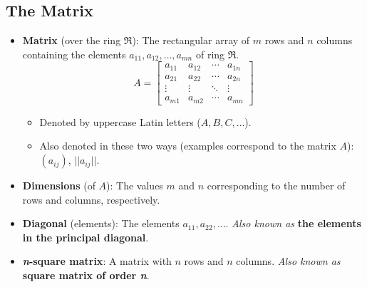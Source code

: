 \documentclass[titlepage]{article}
\numberwithin{figure}{section}
\numberwithin{equation}{section}
\begin{document}
\subsection{The Matrix}
\begin{itemize}
    \item \textbf{Matrix} (over the ring $\mathfrak{R}$): The rectangular array of $m$ rows and $n$ columns containing the elements $a_{11},a_{12},\dots,a_{mn}$ of ring $\mathfrak{R}$.
    \begin{equation*}
        A=
        \begin{bmatrix}
            a_{11} & a_{12} & \cdots & a_{1n}\\
            a_{21} & a_{22} & \cdots & a_{2n}\\
            \vdots & \vdots & \ddots & \vdots\\
            a_{m1} & a_{m2} & \cdots & a_{mn}
        \end{bmatrix}
    \end{equation*}
    \begin{itemize}
        \item Denoted by uppercase Latin letters ($A,B,C,\dots$).
        \item Also denoted in these two ways (examples correspond to the matrix $A$): $(a_{ij})$, $||a_{ij}||$.
    \end{itemize}
    \item \textbf{Dimensions} (of $A$): The values $m$ and $n$ corresponding to the number of rows and columns, respectively.
    \item \textbf{Diagonal} (elements): The elements $a_{11},a_{22},\dots$. \emph{Also known as} \textbf{the elements in the principal diagonal}.
    \item \textbf{\emph{n}-square matrix}: A matrix with $n$ rows and $n$ columns. \emph{Also known as} \textbf{square matrix of order \emph{n}}.
\end{itemize}
\end{document}
